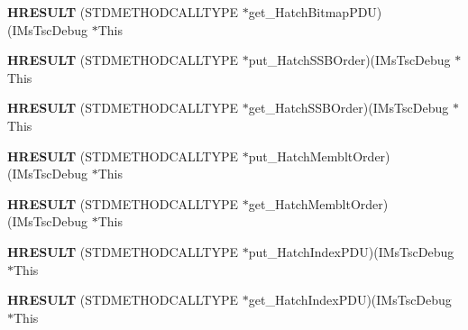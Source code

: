 \begin{DoxyCompactItemize}
\item 
\mbox{\label{struct_i_ms_tsc_debug_vtbl_a9e75f342d7a9a682b8ee56596c7e50ad}} 
{\bfseries H\+R\+E\+S\+U\+LT} (S\+T\+D\+M\+E\+T\+H\+O\+D\+C\+A\+L\+L\+T\+Y\+PE $\ast$get\+\_\+\+Hatch\+Bitmap\+P\+DU)(I\+Ms\+Tsc\+Debug $\ast$This
\item 
\mbox{\label{struct_i_ms_tsc_debug_vtbl_acce30e29d84df83c31181691217bcfbf}} 
{\bfseries H\+R\+E\+S\+U\+LT} (S\+T\+D\+M\+E\+T\+H\+O\+D\+C\+A\+L\+L\+T\+Y\+PE $\ast$put\+\_\+\+Hatch\+S\+S\+B\+Order)(I\+Ms\+Tsc\+Debug $\ast$This
\item 
\mbox{\label{struct_i_ms_tsc_debug_vtbl_a71ab991dc2b61fd6a7e932de2ca896eb}} 
{\bfseries H\+R\+E\+S\+U\+LT} (S\+T\+D\+M\+E\+T\+H\+O\+D\+C\+A\+L\+L\+T\+Y\+PE $\ast$get\+\_\+\+Hatch\+S\+S\+B\+Order)(I\+Ms\+Tsc\+Debug $\ast$This
\item 
\mbox{\label{struct_i_ms_tsc_debug_vtbl_ad1fa9bdf09b80c3d34af91a3610b5fe4}} 
{\bfseries H\+R\+E\+S\+U\+LT} (S\+T\+D\+M\+E\+T\+H\+O\+D\+C\+A\+L\+L\+T\+Y\+PE $\ast$put\+\_\+\+Hatch\+Memblt\+Order)(I\+Ms\+Tsc\+Debug $\ast$This
\item 
\mbox{\label{struct_i_ms_tsc_debug_vtbl_af988d454f757422012e17680379db0d8}} 
{\bfseries H\+R\+E\+S\+U\+LT} (S\+T\+D\+M\+E\+T\+H\+O\+D\+C\+A\+L\+L\+T\+Y\+PE $\ast$get\+\_\+\+Hatch\+Memblt\+Order)(I\+Ms\+Tsc\+Debug $\ast$This
\item 
\mbox{\label{struct_i_ms_tsc_debug_vtbl_a8b73ef4934ebd7be0d9353e4aabee056}} 
{\bfseries H\+R\+E\+S\+U\+LT} (S\+T\+D\+M\+E\+T\+H\+O\+D\+C\+A\+L\+L\+T\+Y\+PE $\ast$put\+\_\+\+Hatch\+Index\+P\+DU)(I\+Ms\+Tsc\+Debug $\ast$This
\item 
\mbox{\label{struct_i_ms_tsc_debug_vtbl_a616f99402e13b92662bb238cd77099cb}} 
{\bfseries H\+R\+E\+S\+U\+LT} (S\+T\+D\+M\+E\+T\+H\+O\+D\+C\+A\+L\+L\+T\+Y\+PE $\ast$get\+\_\+\+Hatch\+Index\+P\+DU)(I\+Ms\+Tsc\+Debug $\ast$This
\item 
\mbox{\label{struct_i_ms_tsc_debug_vtbl_a238c97663f8f765bdccd3a70fd1dffef}} 

\end{DoxyCompactItemize}
